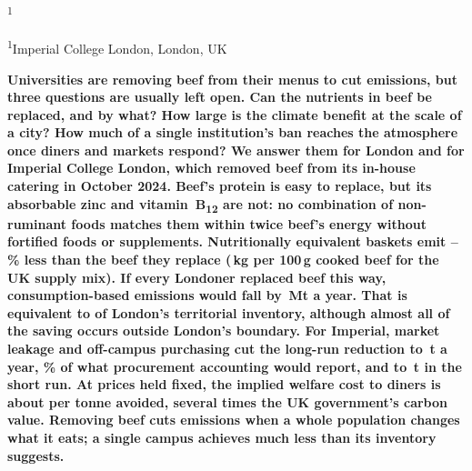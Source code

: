 \documentclass[10pt]{article}
\begin{document}
\begin{center}
{\sffamily\bfseries\LARGE \PaperTitle\par}
\vspace{8pt}
{\sffamily\large \PaperAuthor\textsuperscript{1}\par}
\vspace{3pt}
{\sffamily\small \textsuperscript{1}Imperial College London, London, UK\par}
\end{center}
\vspace{4pt}

\noindent\textbf{Universities are removing beef from their menus to cut emissions, but three
questions are usually left open. Can the nutrients in beef be replaced, and by what?
How large is the climate benefit at the scale of a city? How much of a single
institution's ban reaches the atmosphere once diners and markets respond? We answer
them for London and for Imperial College London, which removed beef from its in-house
catering in October 2024. Beef's protein is easy to replace, but its absorbable zinc and
vitamin~B\textsubscript{12} are not: no combination of non-ruminant foods matches them within
twice beef's energy without fortified foods or supplements. Nutritionally equivalent
baskets emit \ReductionMin--\ReductionMax\% less than the beef they replace (\PerHundredUkAttr{}\,kg
\COtwoe{} per 100\,g cooked beef for the UK supply mix). If every Londoner replaced beef
this way, consumption-based emissions would fall by \LondonDeltaMc{}\,Mt \COtwoe{} a year. That
is equivalent to \PctLeggiMc{} of London's territorial inventory, although almost all of the
saving occurs outside London's boundary. For Imperial, market leakage and off-campus
purchasing cut the long-run reduction to \CampusLrNet{}\,t \COtwoe{} a year, \CampusNetVsAcctLr\% of
what procurement accounting would report, and to \CampusSrNet{}\,t in the short run. At
prices held fixed, the implied welfare cost to diners is about \CostPerT{} per tonne avoided,
several times the UK government's carbon value. Removing beef cuts emissions when a
whole population changes what it eats; a single campus achieves much less than its
inventory suggests.}
\end{document}
